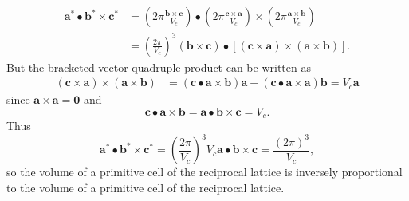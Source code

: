 \documentclass{article}
\begin{document}
\begin{enumerate}[label=(\alph*)]
{\begin{align*}
      \mathbf{a^\ast} \bullet \mathbf{b^\ast} \times \mathbf{c^\ast} 
        &= \left(2 \pi \frac{\mathbf{b} \times \mathbf{c}}{V_c}\right) 
   \bullet \left(2 \pi \frac{\mathbf{c} \times \mathbf{a}}{V_c}\right)
    \times \left(2 \pi \frac{\mathbf{a} \times \mathbf{b}}{V_c}\right) \\
        &= \left(\frac{2 \pi}{V_c}\right)^3 
             (\mathbf{b} \times \mathbf{c})
             \bullet [(\mathbf{c} \times \mathbf{a}) 
                      \times (\mathbf{a} \times \mathbf{b})].
    \end{align*}
    But the bracketed vector quadruple product can be written as
    \begin{align*}
      (\mathbf{c} \times \mathbf{a}) 
       \times (\mathbf{a} \times \mathbf{b})
      &= (\mathbf{c} \bullet \mathbf{a} \times \mathbf{b})\mathbf{a} 
       - (\mathbf{c} \bullet \mathbf{a} \times \mathbf{a})\mathbf{b} = V_c \mathbf{a}
    \end{align*}
    since $\mathbf{a} \times \mathbf{a} = \mathbf{0}$ and 
    $$
    \mathbf{c} \bullet \mathbf{a} \times \mathbf{b} 
     = \mathbf{a} \bullet \mathbf{b} \times \mathbf{c} = V_c.
    $$
    Thus
    $$
    \mathbf{a^\ast} \bullet \mathbf{b^\ast} \times \mathbf{c^\ast} =
      \left(\frac{2 \pi}{V_c}\right)^3 V_c 
        \mathbf{a} \bullet \mathbf{b} \times \mathbf{c} 
    = \frac{(2\pi)^3}{V_c},
    $$
    so the volume of a primitive cell of the reciprocal lattice is 
    inversely proportional to the volume of a primitive cell of the
    reciprocal lattice.
    }
\end{enumerate}

\pagebreak
\end{document}
